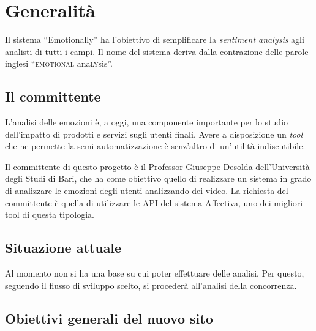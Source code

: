 
\chapter{Generalità}\label{chap:generalita}

Il sistema ``Emotionally'' ha l'obiettivo di semplificare la \textit{sentiment
	analysis} agli analisti di tutti i campi. Il nome del sistema deriva dalla
contrazione delle parole inglesi ``\textsc{emotional} ana\textsc{ly}sis''.

\section{Il committente}\label{sec:il-committente}

L'analisi delle emozioni è, a oggi, una componente importante per lo studio
dell'impatto di prodotti e servizi sugli utenti finali. Avere a disposizione un
\textit{tool} che ne permette la semi-automatizzazione è senz'altro di
un'utilità indiscutibile.

Il committente di questo progetto è il Professor Giuseppe Desolda
dell'Università degli Studi di Bari, che ha come obiettivo quello di realizzare
un sistema in grado di analizzare le emozioni degli utenti analizzando dei
video. La richiesta del committente è quella di utilizzare le API del sistema
Affectiva, uno dei migliori tool di questa tipologia.

\section{Situazione attuale}\label{sec:situazione-attuale}

Al momento non si ha una base su cui poter effettuare delle analisi. Per questo,
seguendo il flusso di sviluppo scelto, si procederà all'analisi della
concorrenza.

\section{Obiettivi generali del nuovo sito}\label{sec:obiettivi-generali-del-nuovo-sito}
